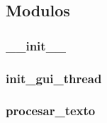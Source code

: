 \subsection{Modulos}

\subsubsection{\_\_init\_\_}

\subsubsection{init\_gui\_thread}

\subsubsection{procesar\_texto}

